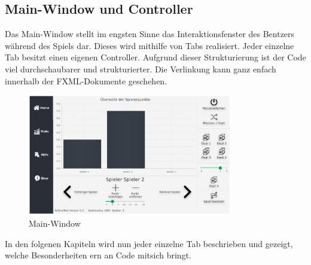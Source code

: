 \subsection{Main-Window und Controller}\label{subsec:mainController}
Das Main-Window stellt im engsten Sinne das Interaktionsfenster des Bentzers während des Spiels dar.
Dieses wird mithilfe von Tabs realisiert.
Jeder einzelne Tab besitzt einen eigenen Controller.
Aufgrund dieser Strukturierung ist der Code viel durchschaubarer und strukturierter.
Die Verlinkung kann ganz enfach innerhalb der FXML-Dokumente geschehen.
\begin{figure}[H]
\centering
\includegraphics[width=0.8\textwidth]{fig/ainf/Main_Home_German.png}
\caption{Main-Window}
\label{mainWindows}
\end{figure}
In den folgenen Kapiteln wird nun jeder einzelne Tab beschrieben und gezeigt, welche Besonderheiten ern an Code mitsich bringt.
